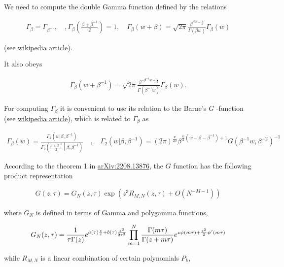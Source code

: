 \documentclass[a4paper]{article}
\numberwithin{equation}{section}
\begin{document}
We need to compute the double Gamma function defined by the relations

\begin{align}
 \Gamma_{\beta}= \Gamma_{\beta^{-1}}, \quad, \Gamma_{\beta}\left( \frac{\beta + \beta^{-1}}{2} \right) = 1, \quad \Gamma_{\beta}(w + \beta) = \sqrt{2\pi} \frac{\beta^{\beta w-\frac{1}{2}}}{\Gamma(\beta w)} \Gamma_{\beta}(w)
\end{align}

(see \href{https://en.wikipedia.org/wiki/Multiple\_gamma\_function}{wikipedia article}).

It also obeys

\begin{align}
  \Gamma_{\beta}(w+\beta^{-1}) = \sqrt{2\pi} \frac{\beta^{-\beta^{-1}w+\frac12}}{\Gamma(\beta^{-1}w)} \Gamma_{\beta}(w).
\end{align}

For computing \(\Gamma_\beta\) it is convenient to use its relation to the Barne's \(G\) -function (see \href{https://en.wikipedia.org/wiki/Barnes\_G-function}{wikipedia article}), which is related to \(\Gamma_\beta\) as

\begin{align}
\Gamma_\beta(w) = \frac{\Gamma_2(w|\beta,\beta^{-1})}{\Gamma_2\left(\frac{\beta+\beta^{-1}}{2}\middle|\beta,\beta^{-1}\right)} \quad , \quad
 \Gamma_2(w|\beta,\beta^{-1})=(2\pi)^{\frac{w}{2\beta}} \beta^{\frac{w}{2}(w-\beta-\beta^{-1})+1} G(\beta^{-1}w,\beta^{-2})^{-1}
\end{align}

According to the theorem 1 in \href{https://arxiv.org/abs/2208.13876}{arXiv:2208.13876}, the \(G\) function has the following product representation

\begin{align}
  G(z, \tau) = G_{N}(z, \tau) \exp\left(z^{3} R_{M,N}(z,\tau) + O(N^{-M-1})\right)
\end{align}

where \(G_N\) is defined in terms of Gamma and polygamma functions,

\begin{align}\label{eq:Barnes_{GN}}
 G_N(z,\tau) = \frac{1}{\tau\Gamma(z)} e^{a(\tau) \frac{z}{\tau}+b(\tau)\frac{z^2}{2\tau^2}}
 \prod_{m=1}^N \frac{\Gamma(m\tau)}{\Gamma(z+m\tau)}e^{z\psi(m\tau)+\frac{z^2}{2}\psi'(m\tau)}
\end{align}

while \(R_{M, N}\) is a linear combination of certain polynomials \(P_k\),
\end{document}
